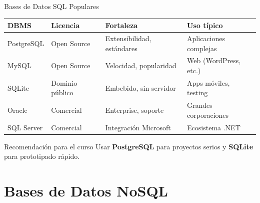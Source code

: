 \documentclass[aspectratio=169]{beamer}
\begin{document}
\begin{frame}{Bases de Datos SQL Populares}
    \begin{table}[]
        \centering
        \renewcommand{\arraystretch}{1.4}
        \scriptsize
        \begin{tabular}{p{2.5cm} p{3cm} p{3cm} p{3.5cm}}
            \toprule
            \textbf{DBMS} & \textbf{Licencia} & \textbf{Fortaleza} & \textbf{Uso típico} \\
            \midrule
            PostgreSQL & Open Source & Extensibilidad, estándares & Aplicaciones complejas \\
            MySQL & Open Source & Velocidad, popularidad & Web (WordPress, etc.) \\
            SQLite & Dominio público & Embebido, sin servidor & Apps móviles, testing \\
            Oracle & Comercial & Enterprise, soporte & Grandes corporaciones \\
            SQL Server & Comercial & Integración Microsoft & Ecosistema .NET \\
            \bottomrule
        \end{tabular}
    \end{table}
    
    \vspace{0.3cm}
    \begin{alertblock}{Recomendación para el curso}
        Usar \textbf{PostgreSQL} para proyectos serios y \textbf{SQLite} para prototipado rápido.
    \end{alertblock}
\end{frame}

\section{Bases de Datos NoSQL}
\end{document}
